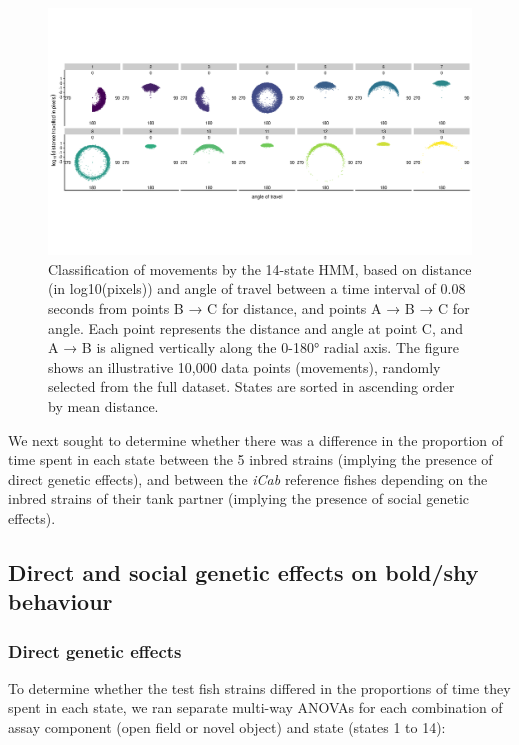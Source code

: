 \documentclass[
]{book}
\begin{document}
\begin{figure}
\includegraphics[width=1\linewidth]{figs/pilot/polar_all_dge} \caption{Classification of movements by the 14-state HMM, based on distance (in log10(pixels)) and angle of travel between a time interval of 0.08 seconds from points B → C for distance, and points A → B → C for angle. Each point represents the distance and angle at point C, and A → B is aligned vertically along the 0-180° radial axis. The figure shows an illustrative 10,000 data points (movements), randomly selected from the full dataset. States are sorted in ascending order by mean distance.}\label{fig:pilot-polar}
\end{figure}

We next sought to determine whether there was a difference in the proportion of time spent in each state between the 5 inbred strains (implying the presence of direct genetic effects), and between the \emph{iCab} reference fishes depending on the inbred strains of their tank partner (implying the presence of social genetic effects).

\hypertarget{direct-and-social-genetic-effects-on-boldshy-behaviour}{%
\subsection{Direct and social genetic effects on bold/shy behaviour}\label{direct-and-social-genetic-effects-on-boldshy-behaviour}}

\hypertarget{direct-genetic-effects}{%
\subsubsection{Direct genetic effects}\label{direct-genetic-effects}}

To determine whether the test fish strains differed in the proportions of time they spent in each state, we ran separate multi-way ANOVAs for each combination of assay component (open field or novel object) and state (states 1 to 14):
\end{document}
